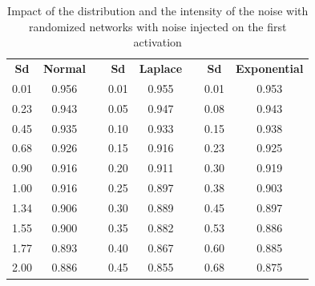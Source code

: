 \begin{table}[htbp]
  \centering
  \caption{Impact of the distribution and the intensity of the noise with randomized networks with noise injected on the first activation}
  \label{table:ap3-acc_noise_activation-appendix}%
    \begin{tabular}{rcrrcrrc}
    \toprule
    \multicolumn{1}{c}{\textbf{Sd}} & \textbf{Normal} &       & \multicolumn{1}{c}{\textbf{Sd}} & \textbf{Laplace} &       & \multicolumn{1}{c}{\textbf{Sd}} & \textbf{Exponential} \\
    \cmidrule{1-2}\cmidrule{4-5}\cmidrule{7-8}    0.01  & 0.956 &       & 0.01  & 0.955 &       & 0.01  & 0.953 \\
    0.23  & 0.943 &       & 0.05  & 0.947 &       & 0.08  & 0.943 \\
    0.45  & 0.935 &       & 0.10  & 0.933 &       & 0.15  & 0.938 \\
    0.68  & 0.926 &       & 0.15  & 0.916 &       & 0.23  & 0.925 \\
    0.90  & 0.916 &       & 0.20  & 0.911 &       & 0.30  & 0.919 \\
    1.00  & 0.916 &       & 0.25  & 0.897 &       & 0.38  & 0.903 \\
    1.34  & 0.906 &       & 0.30  & 0.889 &       & 0.45  & 0.897 \\
    1.55  & 0.900 &       & 0.35  & 0.882 &       & 0.53  & 0.886 \\
    1.77  & 0.893 &       & 0.40  & 0.867 &       & 0.60  & 0.885 \\
    2.00  & 0.886 &       & 0.45  & 0.855 &       & 0.68  & 0.875 \\
    \bottomrule
    \end{tabular}%
\end{table}%


